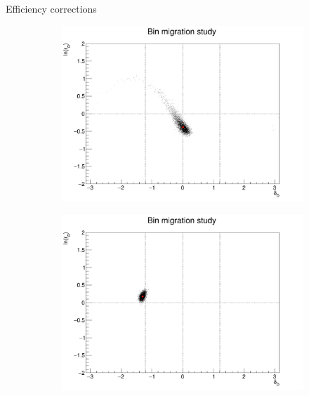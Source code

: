\documentclass{beamer}
\begin{document}
\begin{frame}{Efficiency corrections}
  \begin{figure}
    \centering
    \begin{subfigure}{0.38\textwidth}
      \centering
      \includegraphics[width=\textwidth]{Plots/BinMigration_Point0.png}
    \end{subfigure}%
    \begin{subfigure}{0.38\textwidth}
      \centering
      \includegraphics[width=\textwidth]{Plots/BinMigration_Point3.png}
    \end{subfigure}
    \begin{subfigure}{0.38\textwidth}
      \centering

\end{subfigure}
\end{figure}
\end{frame}
\end{document}
